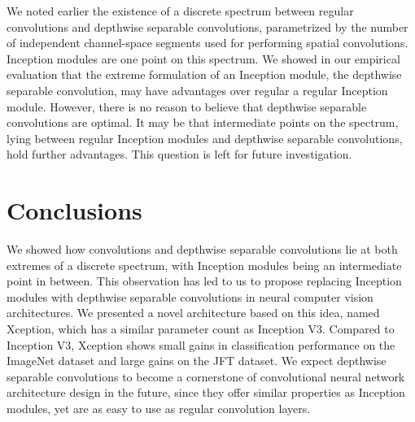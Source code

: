 \documentclass[10pt,twocolumn,letterpaper]{article}
\begin{document}
We noted earlier the existence of a discrete spectrum between regular convolutions and depthwise separable convolutions, parametrized by the number of independent channel-space segments used for performing spatial convolutions. Inception modules are one point on this spectrum. We showed in our empirical evaluation that the extreme formulation of an Inception module, the depthwise separable convolution, may have advantages over regular a regular Inception module. However, there is no reason to believe that depthwise separable convolutions are optimal. It may be that intermediate points on the spectrum, lying between regular Inception modules and depthwise separable convolutions, hold further advantages. This question is left for future investigation.

\section{Conclusions}

We showed how convolutions and depthwise separable convolutions lie at both extremes of a discrete spectrum, with Inception modules being an intermediate point in between. This observation has led to us to propose replacing Inception modules with depthwise separable convolutions in neural computer vision architectures. We presented a novel architecture based on this idea, named Xception, which has a similar parameter count as Inception V3. Compared to Inception V3, Xception shows small gains in classification performance on the ImageNet dataset and large gains on the JFT dataset. We expect depthwise separable convolutions to become a cornerstone of convolutional neural network architecture design in the future, since they offer similar properties as Inception modules, yet are as easy to use as regular convolution layers.


\begin{small}

{\small


}

\end{small}
\end{document}
